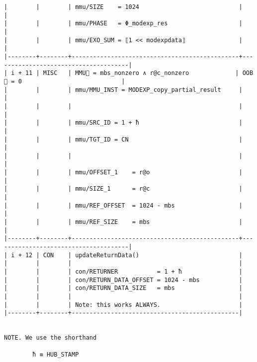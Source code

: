 \documentclass[varwidth=\maxdimen,margin=0.5cm,multi={verbatim}]{standalone}
\begin{document}
\begin{verbatim}
|        |        | mmu/SIZE    = 1024                            |                                      |
|        |        | mmu/PHASE   = Φ_modexp_res                    |                                      |
|        |        | mmu/EXO_SUM = ⟦1 << modexpdata⟧               |                                      |
|--------+--------+-----------------------------------------------+--------------------------------------|
| i + 11 | MISC   | MMU🏴 = mbs_nonzero ∧ r@c_nonzero             | OOB🏴 = 0                            |
|        |        | mmu/MMU_INST = MODEXP_copy_partial_result     |                                      |
|        |        |                                               |                                      |
|        |        | mmu/SRC_ID = 1 + ħ                            |                                      |
|        |        | mmu/TGT_ID = CN                               |                                      |
|        |        |                                               |                                      |
|        |        | mmu/OFFSET_1    = r@o                         |                                      |
|        |        | mmu/SIZE_1      = r@c                         |                                      |
|        |        | mmu/REF_OFFSET  = 1024 - mbs                  |                                      |
|        |        | mmu/REF_SIZE    = mbs                         |                                      |
|--------+--------+-----------------------------------------------+--------------------------------------|
| i + 12 | CON    | updateReturnData()                            |
|        |        |                                               |
|        |        | con/RETURNER           = 1 + ħ                |
|        |        | con/RETURN_DATA_OFFSET = 1024 - mbs           |
|        |        | con/RETURN_DATA_SIZE   = mbs                  |
|        |        |                                               |
|        |        | Note: this works ALWAYS.                      |
|--------+--------+-----------------------------------------------|


NOTE. We use the shorthand

        ħ ≡ HUB_STAMP

\end{verbatim}
\end{document}
